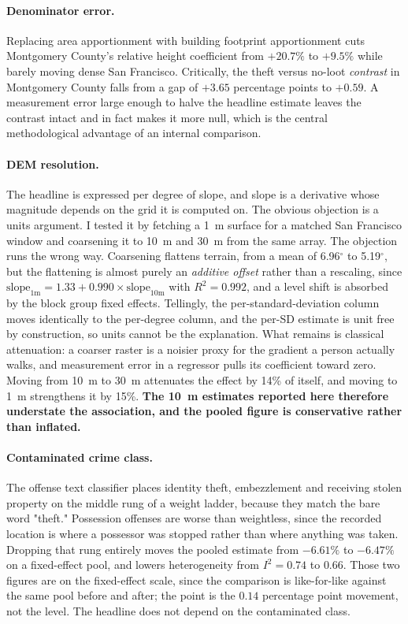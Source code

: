 \documentclass[11pt,letterpaper]{article}
\begin{document}
\paragraph{Denominator error.} Replacing area apportionment with building footprint
apportionment cuts Montgomery County's relative height coefficient from $+20.7\%$ to
$+9.5\%$ while barely moving dense San Francisco. Critically, the theft versus no-loot
\emph{contrast} in Montgomery County falls from a gap of $+3.65$ percentage points to
$+0.59$. A measurement error large enough to halve the headline estimate leaves the
contrast intact and in fact makes it more null, which is the central methodological
advantage of an internal comparison.

\paragraph{DEM resolution.} The headline is expressed per degree of slope, and slope is
a derivative whose magnitude depends on the grid it is computed on. The obvious
objection is a units argument. I tested it by fetching a 1~m surface for a matched
San Francisco window and coarsening it to 10~m and 30~m from the same array. The
objection runs the wrong way. Coarsening flattens terrain, from a mean of 6.96$^\circ$
to 5.19$^\circ$, but the flattening is almost purely an \emph{additive offset} rather
than a rescaling, since $\text{slope}_{1\text{m}} = 1.33 + 0.990 \times
\text{slope}_{10\text{m}}$ with $R^2 = 0.992$, and a level shift is absorbed by the
block group fixed effects. Tellingly, the per-standard-deviation column moves
identically to the per-degree column, and the per-SD estimate is unit free by
construction, so units cannot be the explanation. What remains is classical
attenuation: a coarser raster is a noisier proxy for the gradient a person actually
walks, and measurement error in a regressor pulls its coefficient toward zero. Moving
from 10~m to 30~m attenuates the effect by 14\% of itself, and moving to 1~m
strengthens it by 15\%. \textbf{The 10~m estimates reported here therefore understate
the association, and the pooled figure is conservative rather than inflated.}

\paragraph{Contaminated crime class.} The offense text classifier places identity
theft, embezzlement and receiving stolen property on the middle rung of a weight
ladder, because they match the bare word "theft." Possession offenses are worse than
weightless, since the recorded location is where a possessor was stopped rather than
where anything was taken. Dropping that rung entirely moves the pooled estimate from
$-6.61\%$ to $-6.47\%$ on a fixed-effect pool, and lowers heterogeneity from
$I^2 = 0.74$ to $0.66$. Those two figures are on the fixed-effect scale, since the
comparison is like-for-like against the same pool before and after; the point is the
$0.14$ percentage point movement, not the level. The headline does not depend on the
contaminated class.
\end{document}
